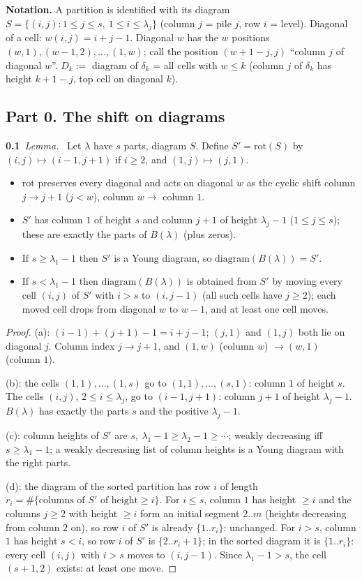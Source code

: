 \documentclass[11pt]{article}
\newcommand{\step}[2]{\par\medskip\noindent\textbf{#1}\ \textit{#2}\ }
\newcommand{\rot}{\mathrm{rot}}
\begin{document}
\medskip
\noindent\textbf{Notation.} A partition is identified with its diagram $S=\{(i,j): 1\le j\le s,\ 1\le i\le\lambda_j\}$ (column $j$ = pile $j$, row $i$ = level).
Diagonal of a cell: $w(i,j)=i+j-1$. Diagonal $w$ has the $w$ positions $(w,1),(w-1,2),\ldots,(1,w)$; call the position $(w+1-j,j)$ ``column $j$ of diagonal $w$''.
$D_k:=$ diagram of $\delta_k$ = all cells with $w\le k$ (column $j$ of $\delta_k$ has height $k+1-j$, top cell on diagonal $k$).

\subsection*{Part 0. The shift on diagrams}

\step{0.1}{Lemma.} Let $\lambda$ have $s$ parts, diagram $S$. Define $S'=\rot(S)$ by $(i,j)\mapsto(i-1,j+1)$ if $i\ge 2$, and $(1,j)\mapsto(j,1)$.
\begin{itemize}
\item[(a)] $\rot$ preserves every diagonal and acts on diagonal $w$ as the cyclic shift column $j\to j+1$ ($j<w$), column $w\to$ column $1$.
\item[(b)] $S'$ has column $1$ of height $s$ and column $j+1$ of height $\lambda_j-1$ ($1\le j\le s$); these are exactly the parts of $B(\lambda)$ (plus zeros).
\item[(c)] If $s\ge\lambda_1-1$ then $S'$ is a Young diagram, so $\mathrm{diagram}(B(\lambda))=S'$.
\item[(d)] If $s<\lambda_1-1$ then $\mathrm{diagram}(B(\lambda))$ is obtained from $S'$ by moving every cell $(i,j)$ of $S'$ with $i>s$ to $(i,j-1)$ (all such cells have $j\ge2$); each moved cell drops from diagonal $w$ to $w-1$, and at least one cell moves.
\end{itemize}
\begin{proof}
(a): $(i-1)+(j+1)-1=i+j-1$; $(j,1)$ and $(1,j)$ both lie on diagonal $j$. Column index $j\to j+1$, and $(1,w)$ (column $w$) $\to(w,1)$ (column $1$).

(b): the cells $(1,1),\ldots,(1,s)$ go to $(1,1),\ldots,(s,1)$: column $1$ of height $s$. The cells $(i,j)$, $2\le i\le\lambda_j$, go to $(i-1,j+1)$: column $j+1$ of height $\lambda_j-1$. $B(\lambda)$ has exactly the parts $s$ and the positive $\lambda_j-1$.

(c): column heights of $S'$ are $s,\ \lambda_1-1\ge\lambda_2-1\ge\cdots$; weakly decreasing iff $s\ge\lambda_1-1$; a weakly decreasing list of column heights is a Young diagram with the right parts.

(d): the diagram of the sorted partition has row $i$ of length $r_i=\#\{\text{columns of }S'\text{ of height}\ge i\}$. For $i\le s$, column $1$ has height $\ge i$ and the columns $j\ge2$ with height $\ge i$ form an initial segment $2..m$ (heights decreasing from column $2$ on), so row $i$ of $S'$ is already $\{1..r_i\}$: unchanged. For $i>s$, column $1$ has height $s<i$, so row $i$ of $S'$ is $\{2..r_i+1\}$; in the sorted diagram it is $\{1..r_i\}$: every cell $(i,j)$ with $i>s$ moves to $(i,j-1)$. Since $\lambda_1-1>s$, the cell $(s+1,2)$ exists: at least one move.
\end{proof}
\end{document}

